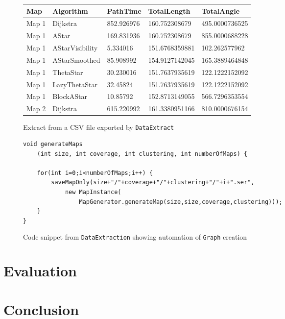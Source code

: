 \documentclass[12pt,twoside,notitlepage]{report}
\begin{document}
\begin{figure}
\centering
    \begin{tabular}{| l | l | l | l | l |}
    \hline
    Map & Algorithm & PathTime & TotalLength & TotalAngle\\ \hline %
     Map 1 & Dijkstra & 852.926976 & 160.752308679 & 495.0000736525\\ \hline %
     Map 1 & AStar & 169.831936 & 160.752308679 & 855.0000688228\\ \hline %
     Map 1 & AStarVisibility & 5.334016 & 151.6768359881 & 102.262577962\\ \hline %
Map 1 & AStarSmoothed & 85.908992 & 154.9127142045 & 165.3889464848\\ \hline %
Map 1 & ThetaStar & 30.230016 & 151.7637935619 & 122.1222152092\\ \hline %
Map 1 & LazyThetaStar & 32.45824 & 151.7637935619 & 122.1222152092\\ \hline %
Map 1 & BlockAStar & 10.85792 & 152.8713149055 & 566.7296353554\\ \hline %
Map 2 & Dijkstra & 615.220992 & 161.3380951166 & 810.0000676154\\ \hline %
 \end{tabular}
\caption{Extract from a CSV file exported by {\tt DataExtract}}
\end{figure}

\begin{figure}
\begin{lstlisting}
void generateMaps 
	(int size, int coverage, int clustering, int numberOfMaps) {
	
	for(int i=0;i<numberOfMaps;i++) {
		saveMapOnly(size+"/"+coverage+"/"+clustering+"/"+i+".ser",
			new MapInstance(
				MapGenerator.generateMap(size,size,coverage,clustering)));
	}
}
\end{lstlisting}
\caption{Code snippet from {\tt DataExtraction} showing automation of {\tt Graph} creation}
\end{figure}

\chapter{Evaluation}

\chapter{Conclusion}

\appendix




\cleardoublepage
\end{document}
